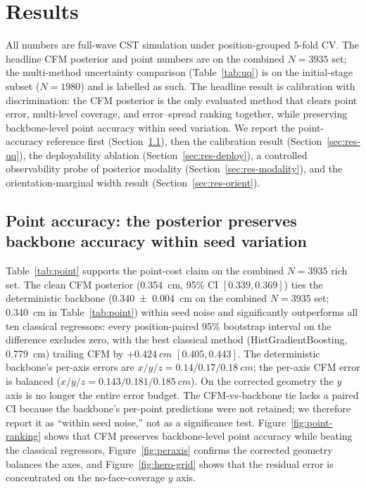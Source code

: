 \section{Results}\label{sec:results}

All numbers are full-wave CST simulation under position-grouped 5-fold CV. The
headline CFM posterior and point numbers are on the combined $N=3935$ set; the
multi-method uncertainty comparison (Table~\ref{tab:uq}) is on the
initial-stage subset ($N=1980$) and is labelled as such. The headline result is
calibration with discrimination: the CFM posterior is the only evaluated method
that clears point error, multi-level coverage, and error--spread ranking
together, while preserving backbone-level point accuracy within seed variation.
We report the point-accuracy reference first (Section~\ref{sec:res-point}),
then the calibration result (Section~\ref{sec:res-uq}), the deployability
ablation (Section~\ref{sec:res-deploy}), a controlled observability probe of
posterior modality (Section~\ref{sec:res-modality}), and the
orientation-marginal width result (Section~\ref{sec:res-orient}).

\subsection{Point accuracy: the posterior preserves backbone accuracy within seed variation}\label{sec:res-point}
Table~\ref{tab:point} supports the point-cost claim on the combined $N=3935$
rich set. The clean
CFM posterior (\SI{0.354}{cm}, 95\% CI $[0.339,0.369]$) ties the deterministic
backbone (\SI{0.340(4)}{cm} on the combined $N=3935$ set; \SI{0.340}{cm} in
Table~\ref{tab:point}) within seed noise and significantly outperforms all ten
classical regressors: every position-paired 95\% bootstrap interval on the
difference excludes zero, with the best classical method (HistGradientBoosting,
\SI{0.779}{cm}) trailing CFM by $+\SI{0.424}{cm}$ $[0.405,0.443]$. The
deterministic backbone's per-axis errors are $x/y/z =
0.14/0.17/0.18\SI{}{cm}$; the per-axis CFM error is balanced ($x/y/z =
0.143/0.181/0.185\SI{}{cm}$). On the corrected geometry the $y$ axis is no
longer the entire error budget. The CFM-vs-backbone
tie lacks a paired CI because the backbone's per-point predictions were not
retained; we therefore report it as ``within seed noise,'' not as a significance
test. Figure~\ref{fig:point-ranking} shows that CFM preserves backbone-level
point accuracy while beating the classical regressors, Figure~\ref{fig:peraxis}
confirms the corrected geometry balances the axes, and
Figure~\ref{fig:hero-grid} shows that the residual error is concentrated on the
no-face-coverage $y$ axis.

